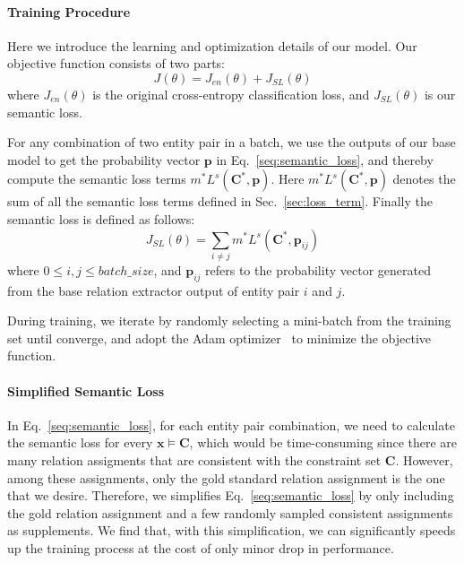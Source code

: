 \paragraph{Training Procedure}
Here we introduce the learning and optimization details of our model. Our objective function consists of two parts:
\begin{equation}
	J(\theta) = J_{en}(\theta) + J_{SL}(\theta)
\end{equation}
where  $J_{en}(\theta)$ is the original cross-entropy classification loss, and $J_{SL}(\theta)$ is our semantic loss.


For any combination of two entity pair in a batch, we use the outputs of our base model to get the probability vector $\bm{p}$ in Eq.~\ref{seq:semantic_loss},
and thereby compute the semantic loss terms $m^{*}L^{s}(\bm{C}^{*}, \bm{p})$.
Here $m^{*}L^{s}(\bm{C}^{*}, \bm{p})$ denotes the sum of all the semantic loss terms defined in Sec.~\ref{sec:loss_term}.
Finally the semantic loss is defined as follows:
\begin{equation}
	J_{SL}(\theta) = \sum\limits_{i \neq j}{m^{*}L^{s}(\bm{C}^{*}, \bm{p}_{ij})}
\end{equation}
where $0\leq i, j \leq batch\_size$, and $\bm{p}_{ij} $ refers to the probability vector generated from the base relation extractor output of entity pair $i$ and $j$.

During training, we iterate by randomly selecting a mini-batch from the training set until converge, and adopt the Adam optimizer~\cite{kingma2014adam} to minimize the objective function.
\paragraph{Simplified Semantic Loss}
\label{Sec:simple_SL}
In Eq.~\ref{seq:semantic_loss}, for each entity pair combination, we need to calculate the semantic loss for every $\bm x \models \bm{C}$, which would be time-consuming since there are many relation assigments that are consistent with the constraint set $\bm{C}$.
However, among these assignments, only the gold standard relation assignment is the one that we desire.
Therefore, we simplifies Eq.~\ref{seq:semantic_loss} by only including the gold relation assignment and a few randomly sampled consistent assignments as supplements.
We find that, with this simplification, we can significantly speeds up the training process at the cost of only minor drop in performance.


